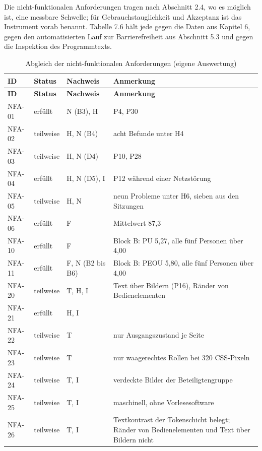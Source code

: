 Die nicht-funktionalen Anforderungen tragen nach Abschnitt 2.4, wo es möglich ist, eine messbare Schwelle; für Gebrauchstauglichkeit und Akzeptanz ist das Instrument vorab benannt. Tabelle 7.6 hält jede gegen die Daten aus Kapitel 6, gegen den automatisierten Lauf zur Barrierefreiheit aus Abschnitt 5.3 und gegen die Inspektion des Programmtexts.

\begingroup
\small
\setlength{\tabcolsep}{4pt}
\begin{longtable}{@{}L{1.6cm}L{2.2cm}L{2.6cm}L{7.2cm}@{}}
	\caption[Abgleich der nicht-funktionalen Anforderungen]{Abgleich der nicht-funktionalen Anforderungen (eigene Auswertung)}
	\label{tab:abgleich-nfa}\\
	\toprule
	\textbf{ID} & \textbf{Status} & \textbf{Nachweis} & \textbf{Anmerkung} \\
	\midrule
	\endfirsthead
	\toprule
	\textbf{ID} & \textbf{Status} & \textbf{Nachweis} & \textbf{Anmerkung} \\
	\midrule
	\endhead
	\bottomrule
	\endfoot
	NFA-01 & erfüllt & N (B3), H & P4, P30 \\
	NFA-02 & teilweise & H, N (B4) & acht Befunde unter H4 \\
	NFA-03 & teilweise & H, N (D4) & P10, P28 \\
	NFA-04 & erfüllt & H, N (D5), I & P12 während einer Netzstörung \\
	NFA-05 & teilweise & H, N & neun Probleme unter H6, sieben aus den Sitzungen \\
	NFA-06 & erfüllt & F & Mittelwert 87,3 \\
	NFA-10 & erfüllt & F & Block B: PU 5,27, alle fünf Personen über 4,00 \\
	NFA-11 & erfüllt & F, N (B2 bis B6) & Block B: PEOU 5,80, alle fünf Personen über 4,00 \\
	NFA-20 & teilweise & T, H, I & Text über Bildern (P16), Ränder von Bedienelementen \\
	NFA-21 & erfüllt & H, I & \\
	NFA-22 & teilweise & T & nur Ausgangszustand je Seite \\
	NFA-23 & teilweise & T & nur waagerechtes Rollen bei 320 CSS-Pixeln \\
	NFA-24 & teilweise & T, I & verdeckte Bilder der Beteiligtengruppe \\
	NFA-25 & teilweise & T, I & maschinell, ohne Vorlesesoftware \\
	NFA-26 & teilweise & T, I & Textkontrast der Tokenschicht belegt; Ränder von Bedienelementen und Text über Bildern nicht \\

\end{longtable}
